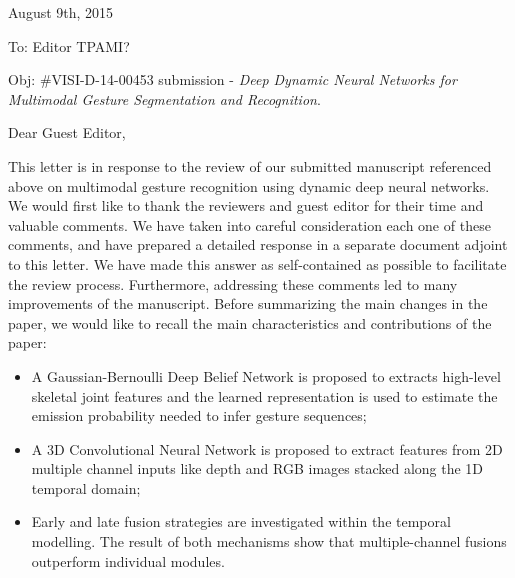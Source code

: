 \documentclass[12pt]{article}
\begin{document}
\begin{center}
\end{center}

\newcommand{\rev}[1]{{\noindent {\bf Comment:} {\it #1}}~\\}
\newcommand{\ans}[1]{{\noindent {\bf Response:} #1}~\\}


\begin{flushleft}
August 9th, 2015
\end{flushleft}

\vspace*{3mm}

\begin{flushleft}
To: Editor TPAMI?
\end{flushleft}

\begin{flushleft}
Obj: \#VISI-D-14-00453 submission - {\em Deep Dynamic Neural Networks for Multimodal Gesture
Segmentation and Recognition}.
\end{flushleft}

\vspace*{3mm}

\pagestyle{empty}

\noindent Dear Guest Editor,
\newline

This letter is in response to the review of our submitted manuscript referenced above on 
multimodal gesture recognition using dynamic deep neural networks.
%
We would first like to thank  the reviewers and guest editor for their time and valuable comments.
We have taken into careful consideration each one of these comments, and have prepared a detailed response
in a separate document adjoint to this letter. 
We have made this answer as self-contained as possible to facilitate the review process.
%
Furthermore, addressing these comments led to many improvements of the manuscript. 
%
Before summarizing the main changes in the paper, we would like to recall the main characteristics and 
contributions of the paper:
\begin{itemize}
\item A Gaussian-Bernoulli Deep Belief Network is proposed to extracts high-level skeletal joint features and the learned representation is used to estimate the emission probability needed to infer gesture sequences;
\item A 3D Convolutional Neural Network  is proposed to extract features from 2D multiple channel inputs 
like  depth and RGB images stacked along the 1D temporal domain;
\item Early and late fusion strategies are investigated within the temporal modelling. The result of both mechanisms
show that multiple-channel fusions outperform individual modules.
\end{itemize}
\end{document}

